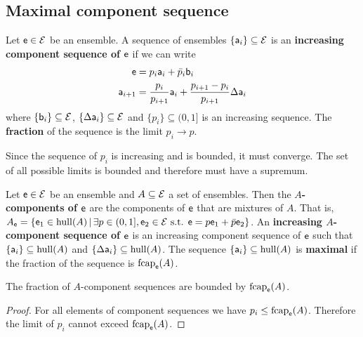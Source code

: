\subsection{Maximal component sequence}

\begin{defn}
	Let $\ens \in \Ens$ be an ensemble. A sequence of ensembles $\{\ens[a]_i\} \subseteq \Ens$ is an \textbf{increasing component sequence of $\ens$} if we can write
	\begin{align*}
		\ens &= p_i \ens[a]_i + \bar{p}_i \ens[b]_i  \\
		\ens[a]_{i+1} &= \frac{p_i}{p_{i+1}} \ens[a]_i + \frac{p_{i+1} - p_i}{p_{i+1}} \Delta \ens[a]_i
	\end{align*}
	where $\{\ens[b]_i\} \subseteq \Ens$, $\{\Delta\ens[a]_i\} \subseteq \Ens$ and $\{p_i\} \subseteq (0,1]$ is an increasing sequence. The \textbf{fraction} of the sequence is the limit $p_i \to p$.
\end{defn}

\begin{remark}
	Since the sequence of $p_i$ is increasing and is bounded, it must converge. The set of all possible limits is bounded and therefore must have a supremum.
\end{remark}

\begin{defn}
	Let $\ens \in \Ens$ be an ensemble and $A \subseteq \Ens$ a set of ensembles. Then the \textbf{$A$-components of $\ens$} are the components of $\ens$ that are mixtures of $A$. That is, $A_{\ens} = \{ \ens_1 \in \hull(A) \, | \, \exists p \in (0,1], \ens_2 \in \Ens \text{ s.t. } \ens = p \ens_1 + \bar{p} \ens_2  \}$. An \textbf{increasing $A$-component sequence of $\ens$} is an increasing component sequence of $\ens$ such that $\{\ens[a]_i\} \subseteq \hull(A)$ and $\{\Delta\ens[a]_i\} \subseteq \hull(A)$. The sequence $\{\ens[a]_i\} \subseteq \hull(A)$ is \textbf{maximal} if the fraction of the sequence is $\fcap_{\ens}(A)$.
\end{defn}

\begin{coro}
	The fraction of $A$-component sequences are bounded by $\fcap_{\ens}(A)$.
\end{coro}

\begin{proof}
	For all elements of component sequences we have $p_i \leq \fcap_{\ens}(A)$. Therefore the limit of $p_i$ cannot exceed $\fcap_{\ens}(A)$.
\end{proof}


